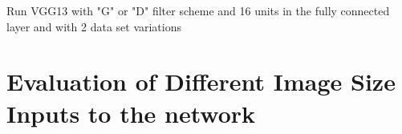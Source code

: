 Run VGG13 with "G" or "D" filter scheme and 16 units in the fully connected layer and with 2 data set variations







\section{Evaluation of Different Image Size Inputs to the network}


\begin{table}[h] \centering
{}
\caption{Resnet18 FiveCrop Implementation with and without pre-training. FINAL (regular) means ResNet18 with the resizing of the image instead of cropping and averaging}
\label{tbl:resnet18-different-input}
\end{table}


